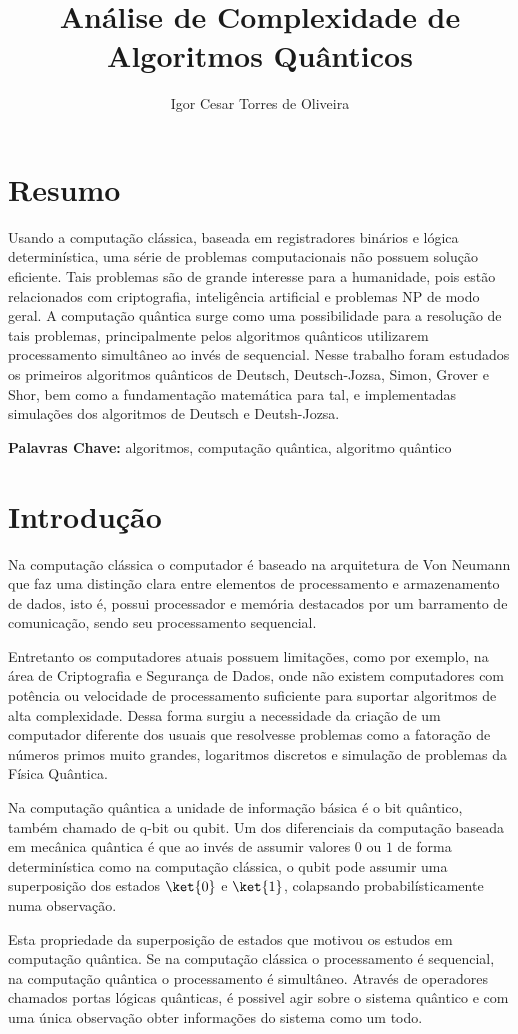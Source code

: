 \documentclass[inci]{imetex}
\author{Igor Cesar Torres de Oliveira}
\title{Análise de Complexidade de Algoritmos Quânticos}
\date{\the\year}
\begin{document}
 
\printFrontMatter

\chapter*{Resumo}
Usando a computação clássica, baseada em registradores binários e lógica determinística, uma série de problemas computacionais não possuem solução eficiente. Tais problemas são de grande interesse para a humanidade, pois estão relacionados com criptografia, inteligência artificial e problemas NP de modo geral. A computação quântica surge como uma possibilidade para a resolução de tais problemas, principalmente pelos algoritmos quânticos utilizarem processamento simultâneo ao invés de sequencial. Nesse trabalho foram estudados os primeiros algoritmos quânticos de Deutsch, Deutsch-Jozsa, Simon, Grover e Shor, bem como a fundamentação matemática para tal, e implementadas simulações dos algoritmos de Deutsch e Deutsh-Jozsa.

\textbf{Palavras Chave:} algoritmos, computação quântica, algoritmo quântico

\chapter{Introdução}
Na computação clássica o computador é baseado na arquitetura de Von Neumann que faz uma distinção clara entre elementos de processamento e armazenamento de dados, isto é, possui processador e memória destacados por um barramento de comunicação, sendo seu processamento sequencial.
 
Entretanto os computadores atuais possuem limitações, como por exemplo, na área de Criptografia e Segurança de Dados, onde não existem computadores com potência ou velocidade de processamento suficiente para suportar algoritmos de alta complexidade. Dessa forma surgiu a necessidade da criação de um computador diferente dos usuais que resolvesse problemas como a fatoração de números primos muito grandes, logaritmos discretos e simulação de problemas da Física Quântica.
  
Na computação quântica a unidade de informação básica é o bit quântico, também chamado de q-bit ou qubit. Um dos diferenciais da computação baseada em mecânica quântica é que ao invés de assumir valores $0$ ou $1$ de forma determinística como na computação clássica, o qubit pode assumir uma superposição dos estados $\ket{0}$ e $\ket{1}$, colapsando probabilísticamente numa observação.
 
Esta propriedade da superposição de estados que motivou os estudos em computação quântica. Se na computação clássica o processamento é sequencial, na computação quântica o processamento é simultâneo. Através de operadores chamados portas lógicas quânticas, é possivel agir sobre o sistema quântico e com uma única observação obter informações do sistema como um todo.
\end{document}

